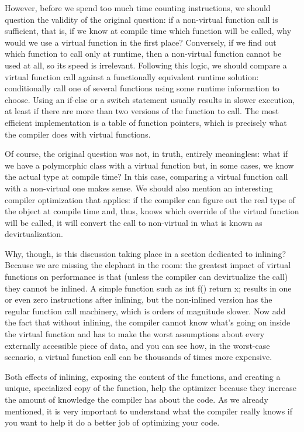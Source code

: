 However, before we spend too much time counting instructions, we should question the validity of the original question: if a non-virtual function call is sufficient, that is, if we know at compile time which function will be called, why would we use a virtual function in the first place? Conversely, if we find out which function to call only at runtime, then a non-virtual function cannot be used at all, so its speed is irrelevant. Following this logic, we should compare a virtual function call against a functionally equivalent runtime solution: conditionally call one of several functions using some runtime information to choose. Using an if-else or a switch statement usually results in slower execution, at least if there are more than two versions of the function to call. The most efficient implementation is a table of function pointers, which is precisely what the compiler does with virtual functions. 

Of course, the original question was not, in truth, entirely meaningless: what if we have a polymorphic class with a virtual function but, in some cases, we know the actual type at compile time? In this case, comparing a virtual function call with a non-virtual one makes sense. We should also mention an interesting compiler optimization that applies: if the compiler can figure out the real type of the object at compile time and, thus, knows which override of the virtual function will be called, it will convert the call to non-virtual in what is known as devirtualization.

Why, though, is this discussion taking place in a section dedicated to inlining? Because we are missing the elephant in the room: the greatest impact of virtual functions on performance is that (unless the compiler can devirtualize the call) they cannot be inlined. A simple function such as int f() { return x; } results in one or even zero instructions after inlining, but the non-inlined version has the regular function call machinery, which is orders of magnitude slower. Now add the fact that without inlining, the compiler cannot know what's going on inside the virtual function and has to make the worst assumptions about every externally accessible piece of data, and you can see how, in the worst-case scenario, a virtual function call can be thousands of times more expensive.

Both effects of inlining, exposing the content of the functions, and creating a unique, specialized copy of the function, help the optimizer because they increase the amount of knowledge the compiler has about the code. As we already mentioned, it is very important to understand what the compiler really knows if you want to help it do a better job of optimizing your code. 

